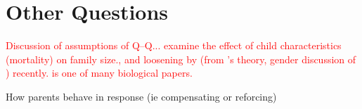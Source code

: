 \newpage



\section{Other Questions}
\textcolor{red}{Discussion of assumptions of Q--Q...
 examine the effect of child 
characteristics (mortality) on family size., and loosening by 
\citet{AizerCunha2012} (from \citet{Behrmanetal1982}'s theory, gender discussion 
of \citet{ButcherCase1994}) recently. \citet{Lawsonetal2012} is one of many 
biological papers.}

How parents behave in response (ie compensating or reforcing)





